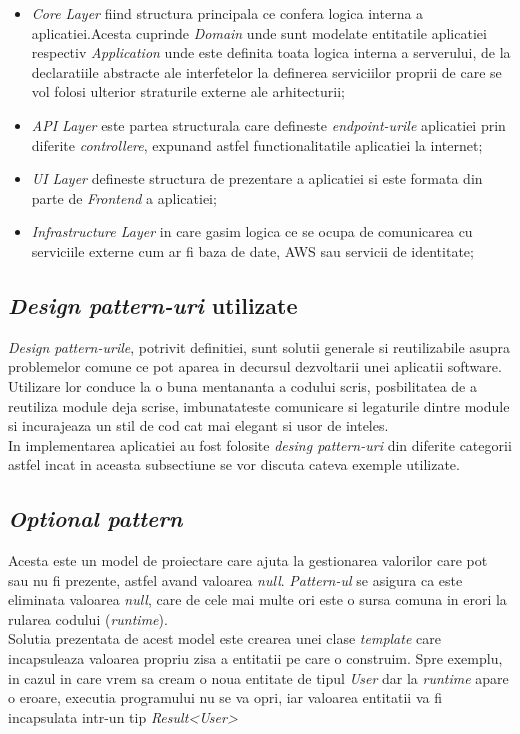 \begin{itemize}
	\item  \textit{Core Layer} fiind structura principala ce confera logica interna a aplicatiei.Acesta cuprinde \textit{Domain} unde sunt modelate entitatile aplicatiei respectiv \textit{Application} unde este definita toata logica interna a serverului,
	de la declaratiile abstracte ale interfetelor la definerea serviciilor proprii de care se vol folosi ulterior straturile externe ale arhitecturii;
	
	\item \textit{API Layer} este partea structurala care defineste \textit{endpoint-urile} aplicatiei prin diferite \textit{controllere}, expunand astfel functionalitatile aplicatiei la internet;
	
  	\item \textit{UI Layer} defineste structura de prezentare a aplicatiei si este formata din parte de \textit{Frontend} a aplicatiei;
  
 	 \item \textit{Infrastructure Layer} in care gasim logica ce se ocupa de comunicarea cu serviciile externe cum ar fi baza de date, AWS sau servicii de identitate;
 	 
\end{itemize}

\subsection*{\textit{Design pattern-uri} utilizate}

\textit{Design pattern-urile}, potrivit definitiei, sunt solutii generale si reutilizabile asupra problemelor comune ce pot aparea in decursul dezvoltarii unei aplicatii software.\\
Utilizare lor conduce la o buna mentananta a codului scris, posbilitatea de a reutiliza module deja scrise, imbunatateste comunicare si legaturile dintre module si incurajeaza un stil de cod cat mai elegant si usor de inteles.\\
In implementarea aplicatiei au fost folosite \textit{desing pattern-uri} din diferite categorii astfel incat in aceasta subsectiune se vor discuta cateva exemple utilizate.

\subsection*{\textit{Optional pattern}}
Acesta este un model de proiectare care ajuta la gestionarea valorilor care pot sau nu fi prezente, astfel avand valoarea \textit{null}. \textit{Pattern-ul} se asigura ca este eliminata valoarea \textit{null}, care de cele mai multe ori este o sursa comuna in erori la rularea codului (\textit{runtime}).\\
Solutia prezentata de acest model este crearea unei clase \textit{template} care incapsuleaza valoarea propriu zisa a entitatii pe care o construim. Spre exemplu, in cazul in care vrem sa cream o noua entitate de tipul \textit{User} dar la \textit{runtime} apare o eroare, executia programului nu se va opri, iar valoarea entitatii va fi incapsulata intr-un tip   \textit{Result\textless User\textgreater}

